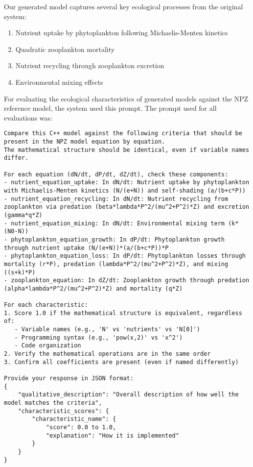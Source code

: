Our generated model captures several key ecological processes from the original system:
\begin{enumerate}
\item Nutrient uptake by phytoplankton following Michaelis-Menten kinetics
\item Quadratic zooplankton mortality
\item Nutrient recycling through zooplankton excretion
\item Environmental mixing effects
\end{enumerate}

For evaluating the ecological characteristics of generated models against the NPZ reference model, the system used this prompt. The prompt used for all evaluations was:

\begin{lstlisting}
Compare this C++ model against the following criteria that should be present in the NPZ model equation by equation.
The mathematical structure should be identical, even if variable names differ.

For each equation (dN/dt, dP/dt, dZ/dt), check these components:
- nutrient_equation_uptake: In dN/dt: Nutrient uptake by phytoplankton with Michaelis-Menten kinetics (N/(e+N)) and self-shading (a/(b+c*P))
- nutrient_equation_recycling: In dN/dt: Nutrient recycling from zooplankton via predation (beta*lambda*P^2/(mu^2+P^2)*Z) and excretion (gamma*q*Z)
- nutrient_equation_mixing: In dN/dt: Environmental mixing term (k*(N0-N))
- phytoplankton_equation_growth: In dP/dt: Phytoplankton growth through nutrient uptake (N/(e+N))*(a/(b+c*P))*P
- phytoplankton_equation_loss: In dP/dt: Phytoplankton losses through mortality (r*P), predation (lambda*P^2/(mu^2+P^2)*Z), and mixing ((s+k)*P)
- zooplankton_equation: In dZ/dt: Zooplankton growth through predation (alpha*lambda*P^2/(mu^2+P^2)*Z) and mortality (q*Z)

For each characteristic:
1. Score 1.0 if the mathematical structure is equivalent, regardless of:
   - Variable names (e.g., 'N' vs 'nutrients' vs 'N[0]')
   - Programming syntax (e.g., 'pow(x,2)' vs 'x^2')
   - Code organization
2. Verify the mathematical operations are in the same order
3. Confirm all coefficients are present (even if named differently)

Provide your response in JSON format:
{
    "qualitative_description": "Overall description of how well the model matches the criteria",
    "characteristic_scores": {
        "characteristic_name": {
            "score": 0.0 to 1.0,
            "explanation": "How it is implemented"
        }
    }
}
\end{lstlisting}

